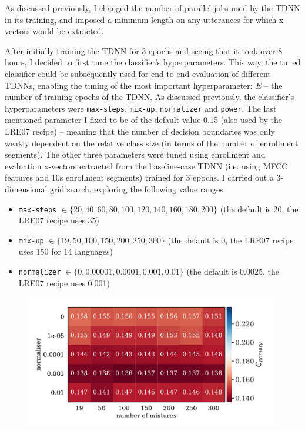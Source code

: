 \documentclass[bsc,frontabs,twoside,singlespacing,parskip,deptreport]{infthesis}
\begin{document}
{{    As discussed previously, I changed the number of parallel jobs used by the TDNN in its training, and imposed a minimum length on any utterances for which x-vectors would be extracted.

    After initially training the TDNN for 3 epochs and seeing that it took over 8 hours, I decided to first tune the classifier's hyperparameters. This way, the tuned classifier could be subsequently used for end-to-end evaluation of different TDNNs, enabling the tuning of the most important hyperparameter: $E$ -- the number of training epochs of the TDNN. As discussed previously, the classifier's hyperparameters were \verb|max-steps|, \verb|mix-up|, \verb|normalizer| and \verb|power|. The last mentioned parameter I fixed to be of the default value 0.15 (also used by the LRE07 recipe) -- meaning that the number of decision boundaries was only weakly dependent on the relative class size (in terms of the number of enrollment segments). The other three parameters were tuned using enrollment and evaluation x-vectors extracted from the baseline-case TDNN (i.e. using MFCC features and 10s enrollment segments) trained for 3 epochs. I carried out a 3-dimensional grid search, exploring the following value ranges: 
    \begin{itemize}
      \item{\verb|max-steps| $ \in \{20, 40, 60, 80, 100, 120, 140, 160, 180, 200\}$ (the default is 20, the LRE07 recipe uses 35)}
      \item{\verb|mix-up| $ \in \{19, 50, 100, 150, 200, 250, 300\}$ (the default is 0, the LRE07 recipe uses 150 for 14 languages)}
      \item{\verb|normalizer| $ \in \{0, 0.00001, 0.0001, 0.001, 0.01\}$ (the default is 0.0025, the LRE07 recipe uses 0.001)}
    \end{itemize}
    \begin{figure}[h!]
      \centering
      \includegraphics[width=11cm]{../img/normaliser_vs_mix-up_best.pdf}

\end{figure}}}
\end{document}
